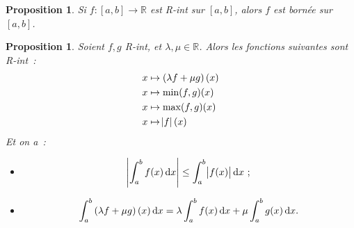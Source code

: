 \documentclass{report}
\newtheorem{prp}[thm]{Proposition}
\theoremstyle{definition}
\theoremstyle{remark}
\numberwithin{equation}{section}
\newcommand{\R}{\mathbb R}
\begin{document}
			\begin{prp} Si $f : [a, b] \to \R$ est R-int sur $[a, b]$, alors $f$ est bornée sur $[a, b]$.
			\end{prp}

			\begin{prp} Soient $f, g$ R-int, et $\lambda, \mu \in \R$. Alors les fonctions suivantes sont R-int~:
			\begin{align}
				&x \mapsto \left(\lambda f + \mu g\right)(x) \\
				&x \mapsto \min(f, g)(x) \\
				&x \mapsto \max(f, g)(x) \\
				&x \mapsto \abs f(x)
			\end{align}
			Et on a~:
			\begin{itemize}
				\item[$(i)$]
					\begin{equation}
						\abs {\int_a^b f(x)\dif x} \leq \int_a^b\abs {f(x)}\dif x~;
					\end{equation}
				\item[$(ii)$]
					\begin{equation}
						\int_a^b\left(\lambda f + \mu g\right)(x)\dif x = \lambda \int_a^b f(x)\dif x + \mu \int_a^b g(x)\dif x.
					\end{equation}
			\end{itemize}
			\end{prp}
\end{document}
